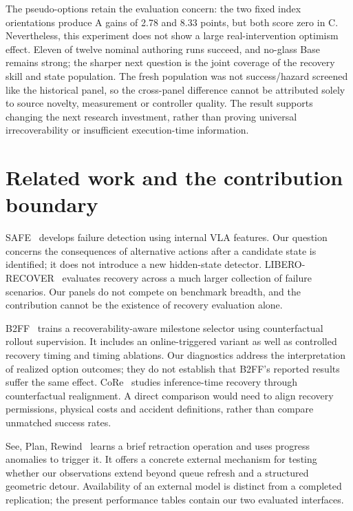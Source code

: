 The pseudo-options retain the evaluation concern: the two fixed index orientations produce A gains of 2.78 and 8.33 points, but both score zero in C. Nevertheless, this experiment does not show a large real-intervention optimism effect. Eleven of twelve nominal authoring runs succeed, and no-glass Base remains strong; the sharper next question is the joint coverage of the recovery skill and state population. The fresh population was not success/hazard screened like the historical panel, so the cross-panel difference cannot be attributed solely to source novelty, measurement or controller quality. The result supports changing the next research investment, rather than proving universal irrecoverability or insufficient execution-time information.


\section{Related work and the contribution boundary}

SAFE~\citep{gu2025safe} develops failure detection using internal VLA features. Our question concerns the consequences of alternative actions after a candidate state is identified; it does not introduce a new hidden-state detector. LIBERO-RECOVER~\citep{liu2026recover} evaluates recovery across a much larger collection of failure scenarios. Our panels do not compete on benchmark breadth, and the contribution cannot be the existence of recovery evaluation alone.


B2FF~\citep{shin2026b2ff} trains a recoverability-aware milestone selector using counterfactual rollout supervision. It includes an online-triggered variant as well as controlled recovery timing and timing ablations. Our diagnostics address the interpretation of realized option outcomes; they do not establish that B2FF's reported results suffer the same effect. CoRe~\citep{zhang2026core} studies inference-time recovery through counterfactual realignment. A direct comparison would need to align recovery permissions, physical costs and accident definitions, rather than compare unmatched success rates.


See, Plan, Rewind~\citep{dai2026spr} learns a brief retraction operation and uses progress anomalies to trigger it. It offers a concrete external mechanism for testing whether our observations extend beyond queue refresh and a structured geometric detour. Availability of an external model is distinct from a completed replication; the present performance tables contain our two evaluated interfaces.


